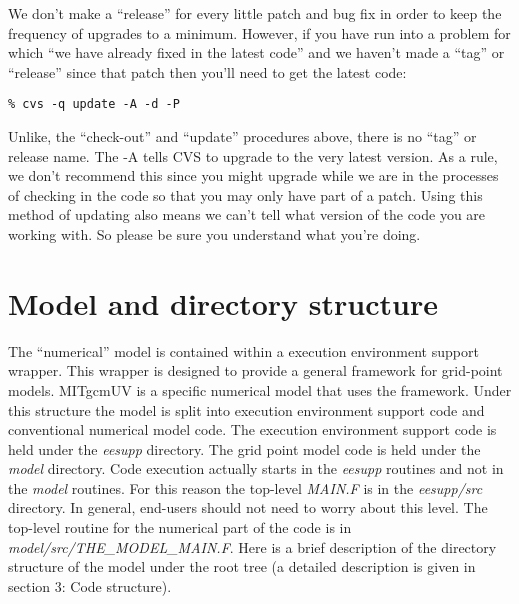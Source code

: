 We don't make a ``release'' for every little patch and bug fix in
order to keep the frequency of upgrades to a minimum. However, if you
have run into a problem for which ``we have already fixed in the
latest code'' and we haven't made a ``tag'' or ``release'' since that
patch then you'll need to get the latest code:
\begin{verbatim}
% cvs -q update -A -d -P
\end{verbatim}
Unlike, the ``check-out'' and ``update'' procedures above, there is no
``tag'' or release name. The -A tells CVS to upgrade to the
very latest version. As a rule, we don't recommend this since you
might upgrade while we are in the processes of checking in the code so
that you may only have part of a patch. Using this method of updating
also means we can't tell what version of the code you are working
with. So please be sure you understand what you're doing.

\section{Model and directory structure}

The ``numerical'' model is contained within a execution environment
support wrapper. This wrapper is designed to provide a general
framework for grid-point models. MITgcmUV is a specific numerical
model that uses the framework. Under this structure the model is split
into execution environment support code and conventional numerical
model code. The execution environment support code is held under the
\textit{eesupp} directory. The grid point model code is held under the
\textit{model} directory. Code execution actually starts in the
\textit{eesupp} routines and not in the \textit{model} routines. For
this reason the top-level \textit{MAIN.F} is in the
\textit{eesupp/src} directory. In general, end-users should not need
to worry about this level. The top-level routine for the numerical
part of the code is in \textit{model/src/THE\_MODEL\_MAIN.F}. Here is
a brief description of the directory structure of the model under the
root tree (a detailed description is given in section 3: Code
structure).

